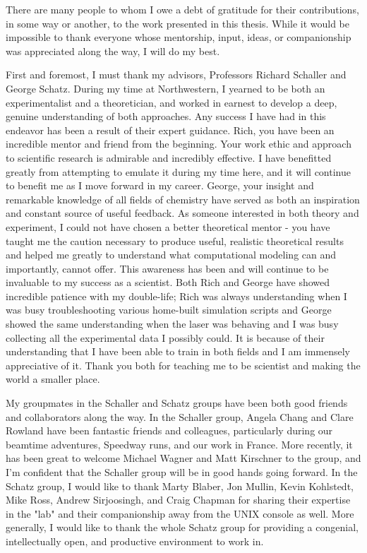 \documentclass[12pt]{nuthesis}	%
\begin{document}
There are many people to whom I owe a debt of gratitude for their contributions, in some way or another, to the work presented in this thesis. While it would be impossible to thank everyone whose mentorship, input, ideas, or companionship was appreciated along the way, I will do my best. \par
First and foremost, I must thank my advisors, Professors Richard Schaller and George Schatz. During my time at Northwestern, I yearned to be both an experimentalist and a theoretician, and worked in earnest to develop a deep, genuine understanding of both approaches. Any success I have had in this endeavor has been a result of their expert guidance. Rich, you have been an incredible mentor and friend from the beginning. Your work ethic and approach to scientific research is admirable and incredibly effective. I have benefitted greatly from attempting to emulate it during my time here, and it will continue to benefit me as I move forward in my career. George, your insight and remarkable knowledge of all fields of chemistry have served as both an inspiration and constant source of useful feedback. As someone interested in both theory and experiment, I could not have chosen a better theoretical mentor - you have taught me the caution necessary to produce useful, realistic theoretical results and helped me greatly to understand what computational modeling can and importantly, cannot offer. This awareness has been and will continue to be invaluable to my success as a scientist. Both Rich and George have showed incredible patience with my double-life; Rich was always understanding when I was busy troubleshooting various home-built simulation scripts and George showed the same understanding when the laser was behaving and I was busy collecting all the experimental data I possibly could. It is because of their understanding that I have been able to train in both fields and I am immensely appreciative of it. Thank you both for teaching me to be scientist and making the world a smaller place. \par
My groupmates in the Schaller and Schatz groups have been both good friends and collaborators along the way. In the Schaller group, Angela Chang and Clare Rowland have been fantastic friends and colleagues, particularly during our beamtime adventures, Speedway runs, and our work in France. More recently, it has been great to welcome Michael Wagner and Matt Kirschner to the group, and I'm confident that the Schaller group will be in good hands going forward. In the Schatz group, I would like to thank Marty Blaber, Jon Mullin, Kevin Kohlstedt, Mike Ross, Andrew Sirjoosingh, and Craig Chapman for sharing their expertise in the "lab" and their companionship away from the UNIX console as well. More generally, I would like to thank the whole Schatz group for providing a congenial, intellectually open, and productive environment to work in.\par
\end{document}
